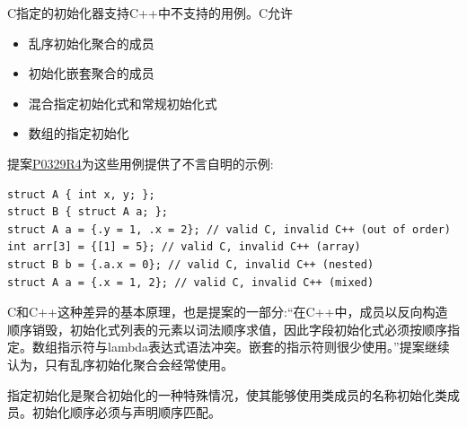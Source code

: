 \begin{tcolorbox}[breakable,enhanced jigsaw,colback=red!5!white,colframe=red!75!black,title={C和C++的区别}]
C指定的初始化器支持C++中不支持的用例。C允许

\begin{itemize}
\item 
乱序初始化聚合的成员

\item 
初始化嵌套聚合的成员

\item 
混合指定初始化式和常规初始化式

\item 
数组的指定初始化
\end{itemize}

提案\href{http://www.open-std.org/jtc1/sc22/wg21/docs/papers/2017/p0329r4.pdf}{P0329R4}为这些用例提供了不言自明的示例:

\begin{lstlisting}[style=styleCXX]
struct A { int x, y; };
struct B { struct A a; };
struct A a = {.y = 1, .x = 2}; // valid C, invalid C++ (out of order)
int arr[3] = {[1] = 5}; // valid C, invalid C++ (array)
struct B b = {.a.x = 0}; // valid C, invalid C++ (nested)
struct A a = {.x = 1, 2}; // valid C, invalid C++ (mixed)
\end{lstlisting}

C和C++这种差异的基本原理，也是提案的一部分:“在C++中，成员以反向构造顺序销毁，初始化式列表的元素以词法顺序求值，因此字段初始化式必须按顺序指定。数组指示符与lambda表达式语法冲突。嵌套的指示符则很少使用。”提案继续认为，只有乱序初始化聚合会经常使用。

\end{tcolorbox}	

\begin{tcolorbox}[breakable,enhanced jigsaw,colback=mygreen!5!white,colframe=mygreen!75!black,title={总结}]
指定初始化是聚合初始化的一种特殊情况，使其能够使用类成员的名称初始化类成员。初始化顺序必须与声明顺序匹配。
\end{tcolorbox}	






